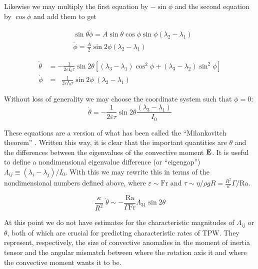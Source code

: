 \documentclass[extra,onecolumn]{gji}
\begin{document}
Likewise we may multiply the first equation by $-\sin{\phi}$ and the second equation by $\cos{\phi}$ and add them to get

\begin{equation}
\begin{aligned}
 & \sin{\theta} \dot{\phi} = A \sin{\theta}\cos{\phi}\sin{\phi} \left( \lambda_2 - \lambda_1 \right ) \\
& \dot{\phi} = \frac{A}{2} \sin{2 \phi} (\lambda_2-\lambda_1)
\end{aligned}
\end{equation}

\else
\fi


\begin{equation}
\begin{aligned}
\dot{\theta} &= - \frac{1}{2 \varepsilon I_0 \tau} \sin{2 \theta} \left[ (\lambda_3-\lambda_1) \cos^2{\phi} + (\lambda_3-\lambda_2) \sin^2{\phi} \right] \\
\dot{\phi} &= \;\; \frac{1}{2 \varepsilon I_0 \tau} \sin{2 \phi} \; (\lambda_2 - \lambda_1)
\end{aligned}
\label{milankovitch}
\end{equation}

Without loss of generality we may choose the coordinate system such that $\phi=0$:
\begin{equation}
\dot{\theta} = - \frac{1}{2 \varepsilon \tau}\sin{2 \theta} \frac{(\lambda_3-\lambda_1)}{I_0}
\label{simple_milankovitch}
\end{equation}

These equations are a version of what has been called the ``Milankovitch theorem'' \citep{munk1960rotation}.  
Written this way, it is clear that the important quantities are $\theta$ and the differences between the eigenvalues of the convective moment $\bf E$.
It is useful to define a nondimensional eigenvalue difference (or ``eigengap'') $\Lambda_{ij} \equiv (\lambda_i - \lambda_j)/I_0$.  
With this we may rewrite this in terms of the nondimensional numbers defined above, where 
$\varepsilon \sim \mathrm{Fr}$ and $\tau \sim \eta / \rho g R = \frac{R^2}{\kappa} \Gamma/\mathrm{Ra}$. 

\begin{equation}
\frac{\kappa}{R^2} \; \dot{\theta} \sim - \frac{\mathrm{Ra}}{\Gamma \mathrm{Fr}} \Lambda_{31} \sin{2 \theta}
\label{scaled_rotation}
\end{equation}

At this point we do not have estimates for the characteristic magnitudes of $\Lambda_{ij}$ or $\theta$, both of which are crucial for predicting characteristic rates of TPW.
They represent, respectively, the size of convective anomalies in the moment of inertia tensor and the angular mismatch between where the 
rotation axis it and where the convective moment wants it to be.
\end{document}
